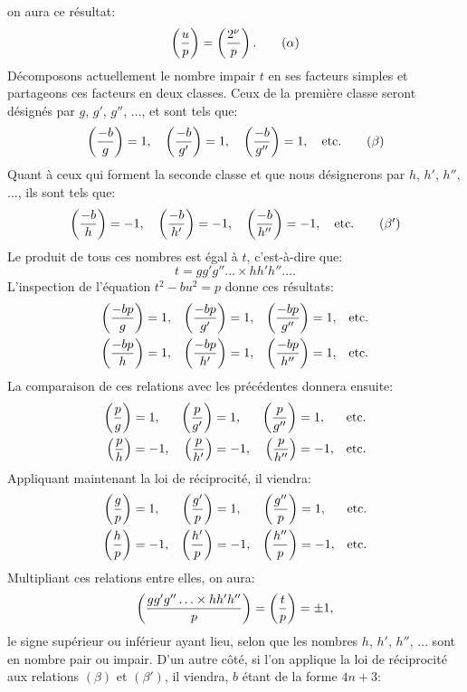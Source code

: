 \noindent
on aura ce résultat:
\begin{equation*}
\left(\frac{u}{p}\right)=\left(\frac{2^\nu}{p}\right).\tag{$\alpha$}
\end{equation*}
Décomposons actuellement le nombre impair $t$ en ses facteurs simples et partageons
ces facteurs en deux classes. Ceux de la première classe seront désignés
par $g$, $g'$, $g''$, $\ldots$, et sont tels que:
\begin{equation*}
\left(\frac{-b}{g}\right)=1,\quad\left(\frac{-b}{g'}\right)=1,\quad\left(\frac{-b}{g''}\right)=1,\quad\text{etc.}\tag{$\beta$}
\end{equation*}
Quant à ceux qui forment la seconde classe et que nous désignerons par $h$,
$h'$, $h''$, $\ldots$, ils sont tels que:
\begin{equation*}
\left(\frac{-b}{h}\right)=-1,\quad\left(\frac{-b}{h'}\right)=-1,\quad\left(\frac{-b}{h''}\right)=-1,\quad\text{etc.}\tag{$\beta'$}
\end{equation*}
Le produit de tous ces nombres est égal à $t$, c'est-à-dire que:
\[
t=gg'g''\ldots\times hh'h''\ldots.
\]
L'inspection de l'équation $t^2-bu^2=p$ donne ces résultats:
\[
\begin{aligned}
\left(\frac{-bp}{g}\right)&=1, &\left(\frac{-bp}{g'}\right)&=1, &\left(\frac{-bp}{g''}\right)&=1, &\text{etc.}\\
\left(\frac{-bp}{h}\right)&=1, &\left(\frac{-bp}{h'}\right)&=1, &\left(\frac{-bp}{h''}\right)&=1, &\text{etc.}
\end{aligned}
\]
La comparaison de ces relations avec les précédentes donnera ensuite:
\[
\begin{aligned}
\left(\frac{p}{g}\right)&=1, &\left(\frac{p}{g'}\right)&=1, &\left(\frac{p}{g''}\right)&=1, &\text{etc.}\\
\left(\frac{p}{h}\right)&=-1, &\left(\frac{p}{h'}\right)&=-1, &\left(\frac{p}{h''}\right)&=-1, &\text{etc.}
\end{aligned}
\]
Appliquant maintenant la loi de réciprocité, il viendra:
\[
\begin{aligned}
\left(\frac{g}{p}\right)&=1, &\left(\frac{g'}{p}\right)&=1, &\left(\frac{g''}{p}\right)&=1, &\text{etc.}\\
\left(\frac{h}{p}\right)&=-1, &\left(\frac{h'}{p}\right)&=-1, &\left(\frac{h''}{p}\right)&=-1, &\text{etc.}
\end{aligned}
\]
Multipliant ces relations entre elles, on aura:
\[
\left(\frac{gg'g''\ldots\times hh'h''}{p}\right)=\left(\frac{t}{p}\right)=\pm1,
\]
le signe supérieur ou inférieur ayant lieu, selon que les nombres $h$, $h'$, $h''$, $\ldots$
sont en nombre pair ou impair. D'un autre côté, si l'on applique la loi de
réciprocité aux relations $(\beta)$ et $(\beta')$, il viendra, $b$ étant de la forme $4n+3$:
